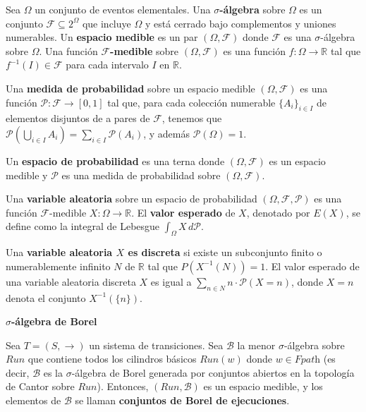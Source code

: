 Sea \( \Omega \) un conjunto de eventos elementales. Una
\textbf{\(\sigma\)-álgebra} sobre \( \Omega \) es un conjunto \( \mathcal{F}
\subseteq 2^{\Omega} \) que incluye \( \Omega \) y está cerrado bajo
complementos y uniones numerables. Un \textbf{espacio medible} es un par \(
(\Omega, \mathcal{F}) \) donde \( \mathcal{F} \) es una \(\sigma\)-álgebra
sobre \( \Omega \). Una función \textbf{\( \mathcal{F} \)-medible} sobre \(
(\Omega, \mathcal{F}) \) es una función \( f : \Omega \rightarrow \mathbb{R} \)
tal que \( f^{-1}(I) \in \mathcal{F} \) para cada intervalo \( I \) en \(
\mathbb{R} \).

Una \textbf{medida de probabilidad} sobre un espacio medible \((\Omega,
\mathcal{F})\) es una función \( \mathcal{P} : \mathcal{F} \rightarrow [0, 1]
\) tal que, para cada colección numerable \(\{A_i\}_{i \in I}\) de elementos
disjuntos de a pares de \(\mathcal{F}\), tenemos que \( \mathcal{P}\left(
\bigcup_{i \in I} A_i \right) = \sum_{i \in I} \mathcal{P}(A_i) \), y además \(
\mathcal{P}(\Omega) = 1 \).

Un \textbf{espacio de probabilidad} es una terna donde \((\Omega,
\mathcal{F})\) es un espacio medible y \(\mathcal{P}\) es una medida de
probabilidad sobre \((\Omega, \mathcal{F})\).

Una \textbf{variable aleatoria} sobre un espacio de probabilidad \((\Omega,
\mathcal{F}, \mathcal{P})\) es una función \(\mathcal{F}\)-medible \(X : \Omega
\rightarrow \mathbb{R}\). El \textbf{valor esperado} de \(X\), denotado por
\(E(X)\), se define como la integral de Lebesgue \(\int_{\Omega} X \,
d\mathcal{P}\).

Una \textbf{variable aleatoria \(X\) es discreta} si existe un subconjunto
finito o numerablemente infinito \(N\) de \(\mathbb{R}\) tal que \(P(X^{-1}(N))
= 1\). El valor esperado de una variable aleatoria discreta \(X\) es igual a
\(\sum_{n \in N} n \cdot \mathcal{P}(X=n)\), donde \(X=n\) denota el conjunto
\(X^{-1}(\{n\})\).

\textbf{$\sigma$-álgebra de Borel}

Sea \( T = (S, \rightarrow) \) un sistema de transiciones. Sea \( \mathcal{B}
\) la menor \(\sigma\)-álgebra sobre \( \textit{Run} \) que contiene todos los
cilindros básicos \( \textit{Run}(w) \) donde \( w \in \textit{Fpath} \) (es
decir, \( \mathcal{B} \) es la \(\sigma\)-álgebra de Borel generada por
conjuntos abiertos en la topología de Cantor sobre \( \textit{Run} \)).
Entonces, \((\textit{Run}, \mathcal{B})\) es un espacio medible, y los
elementos de \( \mathcal{B} \) se llaman \textbf{conjuntos de Borel de
	ejecuciones}.

